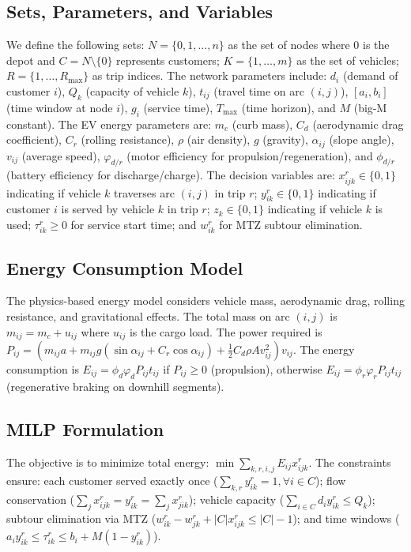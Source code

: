 \documentclass[10pt,a4paper]{article}
\begin{document}
\subsection{Sets, Parameters, and Variables}
We define the following sets: $N = \{0,1,\ldots,n\}$ as the set of nodes where $0$ is the depot and $C = N\setminus\{0\}$ represents customers; $K = \{1,\ldots,m\}$ as the set of vehicles; $R = \{1,\ldots,R_{\max}\}$ as trip indices. The network parameters include: $d_i$ (demand of customer $i$), $Q_k$ (capacity of vehicle $k$), $t_{ij}$ (travel time on arc $(i,j)$), $[a_i,b_i]$ (time window at node $i$), $g_i$ (service time), $T_{\max}$ (time horizon), and $M$ (big-M constant). The EV energy parameters are: $m_c$ (curb mass), $C_d$ (aerodynamic drag coefficient), $C_r$ (rolling resistance), $\rho$ (air density), $g$ (gravity), $\alpha_{ij}$ (slope angle), $v_{ij}$ (average speed), $\varphi_{d/r}$ (motor efficiency for propulsion/regeneration), and $\phi_{d/r}$ (battery efficiency for discharge/charge).
The decision variables are: $x_{ijk}^r \in \{0,1\}$ indicating if vehicle $k$ traverses arc $(i,j)$ in trip $r$; $y_{ik}^r \in \{0,1\}$ indicating if customer $i$ is served by vehicle $k$ in trip $r$; $z_k \in \{0,1\}$ indicating if vehicle $k$ is used; $\tau_{ik}^r \geq 0$ for service start time; and $w_{ik}^r$ for MTZ subtour elimination.
\subsection{Energy Consumption Model}
The physics-based energy model considers vehicle mass, aerodynamic drag, rolling resistance, and gravitational effects. The total mass on arc $(i,j)$ is $m_{ij} = m_c + u_{ij}$ where $u_{ij}$ is the cargo load. The power required is $P_{ij} = (m_{ij}a + m_{ij}g(\sin\alpha_{ij} + C_r\cos\alpha_{ij}) + \frac{1}{2}C_d\rho Av_{ij}^2)v_{ij}$. The energy consumption is $E_{ij} = \phi_d\varphi_d P_{ij}t_{ij}$ if $P_{ij} \geq 0$ (propulsion), otherwise $E_{ij} = \phi_r\varphi_r P_{ij}t_{ij}$ (regenerative braking on downhill segments).
\subsection{MILP Formulation}
The objective is to minimize total energy: $\min \sum_{k,r,i,j} E_{ij}x_{ijk}^r$. The constraints ensure: each customer served exactly once ($\sum_{k,r} y_{ik}^r = 1, \forall i \in C$); flow conservation ($\sum_j x_{ijk}^r = y_{ik}^r = \sum_j x_{jik}^r$); vehicle capacity ($\sum_{i\in C} d_i y_{ik}^r \leq Q_k$); subtour elimination via MTZ ($w_{ik}^r - w_{jk}^r + |C|x_{ijk}^r \leq |C|-1$); and time windows ($a_i y_{ik}^r \leq \tau_{ik}^r \leq b_i + M(1-y_{ik}^r)$).
\end{document}
